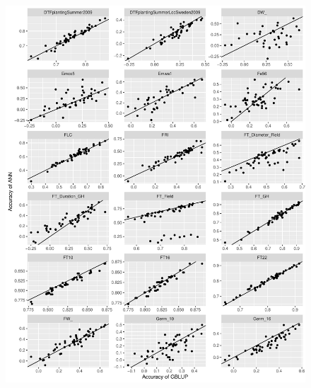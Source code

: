 \begin{figure}[H]
  \centering \includegraphics[height=1.05\textheight, width=1.1\textwidth]{Figures/cor_plots_3}
  \decoRule
 \label{fig:bla}
\end{figure}

